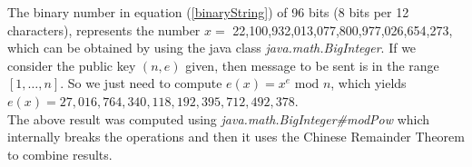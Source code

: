 \documentclass[tikz, 12pt]{scrartcl}
\begin{document}
\begin{enumerate}
	
	The binary number in equation (\ref{binaryString})  of 96 bits (8 bits per 12 characters), represents the number $x=$ 22,100,932,013,077,800,977,026,654,273, which can be obtained by using the java class \textit{java.math.BigInteger}.  If we consider the public key $(n, e)$ given, then message to be sent is in the range $[1, \ldots, n]$. So we just need to compute $e(x) = x^{e} \mbox{ mod } n$, which yields $e(x) = 27,016,764,340,118,192,395,712,492,378$.\\
	The above result was computed using \textit{java.math.BigInteger\#modPow} which internally breaks the operations and then it uses the Chinese Remainder Theorem to combine results.
\end{enumerate}
\end{document}
